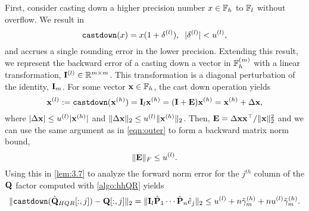 First, consider casting down a higher precision number $x\in\mathbb{F}_h$ to $\mathbb{F}_l$ without overflow. 
We result in \[\text{\tt castdown}(x) = x(1+\delta^{(l)}),\;\; |\delta^{(l)}| < u^{(l)},\]
and accrues a single rounding error in the lower precision.
Extending this result, we represent the backward error of a casting down a vector in $\mathbb{F}_h^{(m)}$ with a linear transformation, $\mathbf{I}^{(l)}\in\mathbb{R}^{m\times m}$.
This transformation is a diagonal perturbation of the identity, $\mathbf{I}_m$.
For some vector $\mathbf{x}\in\mathbb{F}_h$, the cast down operation yields
\begin{equation}
	\mathbf{x}^{(l)} := \text{\tt castdown}(\mathbf{x}^{(h)}) = \mathbf{I}_{l}\mathbf{x}^{(h)} = (\mathbf{I}+\mathbf{E})\mathbf{x}^{(h)} = \mathbf{x}^{(h)}+\Delta \mathbf{x},
\end{equation}
where $|\Delta \mathbf{x}| \leq u^{(l)} |\mathbf{x}^{(h)}|$ and  $\|\Delta \mathbf{x}\|_2 \leq u^{(l)} \|\mathbf{x}^{(h)}\|_2$.
Then, $\mathbf{E} = \Delta \mathbf{x x}^{\top}/\|\mathbf{x}\|_2^2$ and we can use the same argument as in \cref{eqn:outer} to form a backward matrix norm bound, 
\begin{equation}
	\|\bb{E}\|_F\leq u^{(l)}. \label{eqn:castdown}
\end{equation}
Using this in \cref{lem:3.7} to analyze the forward norm error for the $j^{th}$ column of the $\mathbf{Q}$ factor computed with \cref{algo:hhQR} yields
\begin{equation}
	\|\text{\tt castdown}(\hat{\bb{Q}}_{HQR}[:,j]) - \bb{Q}[:,j]\|_2 = \|\bb{I}_l\hat{\bb{P}}_{1}\cdots\hat{\bb{P}}_{n}\hat{e}_j\|_2 \leq u^{(l)}+n\tilde{\gamma}_m^{(h)} + nu^{(l)}\tilde{\gamma}_m^{(h)}.\label{eqn:HQR-mp}
\end{equation}
